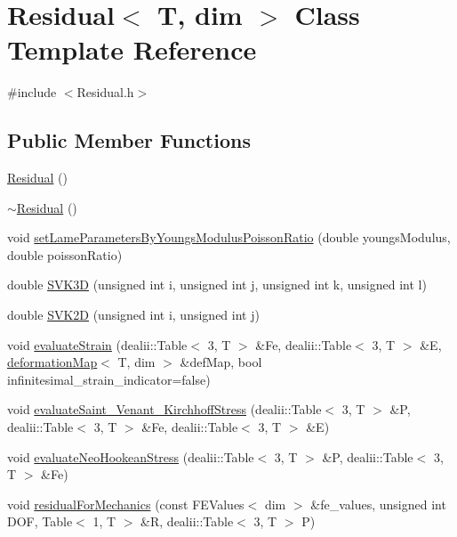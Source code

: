 \section{Residual$<$ T, dim $>$ Class Template Reference}
\label{class_residual}


{\ttfamily \#include $<$Residual.\+h$>$}

\subsection*{Public Member Functions}
\begin{DoxyCompactItemize}
\item 
\mbox{\hyperlink{class_residual_a4b540ba8e3ad0a1f8cfe2b4acd20493b}{Residual}} ()
\item 
\mbox{\hyperlink{class_residual_a8eef8c757003dd763b7dddc733f65641}{$\sim$\+Residual}} ()
\item 
void \mbox{\hyperlink{class_residual_a74a86942f009e483e946ac0a0036bd71}{set\+Lame\+Parameters\+By\+Youngs\+Modulus\+Poisson\+Ratio}} (double youngs\+Modulus, double poisson\+Ratio)
\item 
double \mbox{\hyperlink{class_residual_a10e7144d5c4746f15a48d506830790cb}{S\+V\+K3D}} (unsigned int i, unsigned int j, unsigned int k, unsigned int l)
\item 
double \mbox{\hyperlink{class_residual_abd1627afa72ac735e6907067e1d47bb6}{S\+V\+K2D}} (unsigned int i, unsigned int j)
\item 
void \mbox{\hyperlink{class_residual_a4b181b84ebad5e2adb629b4a542dc9c6}{evaluate\+Strain}} (dealii\+::\+Table$<$ 3, T $>$ \&Fe, dealii\+::\+Table$<$ 3, T $>$ \&E, \mbox{\hyperlink{structdeformation_map}{deformation\+Map}}$<$ T, dim $>$ \&def\+Map, bool infinitesimal\+\_\+strain\+\_\+indicator=false)
\item 
void \mbox{\hyperlink{class_residual_a4215ec5a6eabd7573e0caeee6fd194ad}{evaluate\+Saint\+\_\+\+Venant\+\_\+\+Kirchhoff\+Stress}} (dealii\+::\+Table$<$ 3, T $>$ \&P, dealii\+::\+Table$<$ 3, T $>$ \&Fe, dealii\+::\+Table$<$ 3, T $>$ \&E)
\item 
void \mbox{\hyperlink{class_residual_a0f9ff6a237d377803ce368b26ca39652}{evaluate\+Neo\+Hookean\+Stress}} (dealii\+::\+Table$<$ 3, T $>$ \&P, dealii\+::\+Table$<$ 3, T $>$ \&Fe)
\item 
void \mbox{\hyperlink{class_residual_a432fe02216f182fd241f09775131f854}{residual\+For\+Mechanics}} (const F\+E\+Values$<$ dim $>$ \&fe\+\_\+values, unsigned int D\+OF, Table$<$ 1, T $>$ \&R, dealii\+::\+Table$<$ 3, T $>$ P)

\end{DoxyCompactItemize}
